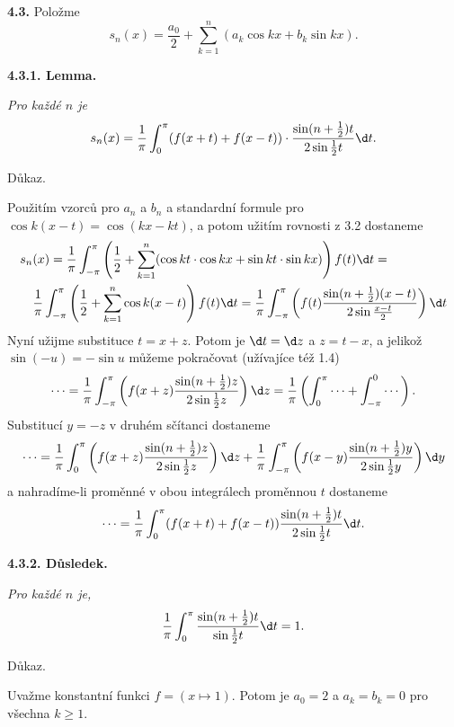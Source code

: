 \documentclass[12pt]{article}
\begin{document}
\bigskip

{\bf 4.3.} Položme
$$
s_n(x)=
\frac{a_0}{2}+\sum_{k=1}^n(a_k\cos kx+ b_k\sin kx).
$$

\medskip

{\bf 4.3.1. Lemma.} {\em Pro každé $n$ je 
$$
s_n(x)=\frac1\pi\int_0^\pi (f(x+t)+f(x-t))\cdot\frac{\sin(n+\frac12)t}{2\sin\frac{1}{2}t}\d t.
$$

Důkaz.} Použitím vzorců pro $a_n$ a $b_n$ a standardní formule pro $\cos k(x-t)=\cos(kx-kt)$, a potom užitím rovnosti z 3.2 dostaneme
$$
\begin{aligned}
s_n&(x)=\frac1\pi\int_{-\pi}^\pi\left(\frac12+\sum_{k=1}^n(\cos kt\cdot\cos kx+\sin kt\cdot\sin  kx)\right)f(t)\d t=\\
&\frac1\pi\int_{-\pi}^\pi\left(\frac12+\sum_{k=1}^n\cos k(x-t)\right)f(t)\d t=
\frac1\pi\int_{-\pi}^\pi\left(f(t)\frac{\sin(n+\frac12)(x-t)}{2\sin\frac{x-t}{2}}\right)\d t
\end{aligned}
$$
Nyní užijme substituce $t=x+z$. Potom je $\d t =\d z$ a $z=t-x$, a jelikož $\sin(-u)=-\sin u$ můžeme pokračovat (užívajíce též 1.4)
$$
\cdots=\frac1\pi\int_{-\pi}^\pi\left(f(x+z)\frac{\sin(n+\frac12)z}{2\sin\frac12z}\right)\d z =
\frac1\pi\left(\int_{0}^\pi \cdots+\int_{-\pi}^0\cdots\right).
$$
Substitucí $y=-z$ v druhém sčítanci dostaneme
$$
\cdots=\frac1\pi\int_{0}^\pi\left(f(x+z)\frac{\sin(n+\frac12)z}{2\sin\frac12z}\right)\d z+
\frac1\pi\int_{-\pi}^\pi\left(f(x-y)\frac{\sin(n+\frac12)y}{2\sin\frac12y}\right)\d y
$$
a nahradíme-li proměnné v obou integrálech proměnnou $t$ dostaneme
$$
\cdots=\frac1\pi\int_{0}^\pi(f(x+t)+f(x-t))\frac{\sin(n+\frac12)t}{2\sin\frac12t}\d t.
$$
\sq

\medskip

{\bf 4.3.2. Důsledek.} {\em Pro každé $n$ je,
$$
\frac1\pi\int_0^\pi\frac{\sin(n+\frac12)t}{\sin\frac{1}{2}t}\d t = 1.
$$

Důkaz.} Uvažme konstantní funkci $f=(x\mapsto 1)$. Potom je $a_0=2$ a $a_k=b_k=0$ pro všechna $k\geq 1$. \sq

\bigskip
\end{document}
